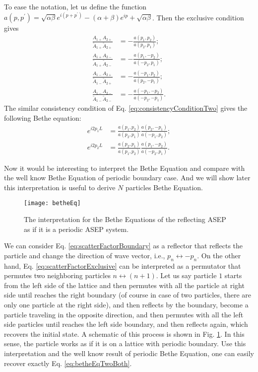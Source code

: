 To ease the notation, let us define the function $a(p, p^\prime) = \sqrt{\alpha\beta}e^{i(p+p^\prime)}-(\alpha+\beta)e^{ip}+\sqrt{\alpha\beta}$. Then the exclusive condition gives 
\begin{subequations}
    \label{eq:scatterFactorExclusive2}
    \begin{align}
        \frac{A_{1+}A_{2+}}{\tilde{A}_{1+}\tilde{A}_{2+}} & =  -\frac{a(p_1, p_2)}{a(p_2, p_1)};\\
        \frac{A_{1+}A_{2-}}{\tilde{A}_{1+}\tilde{A}_{2-}} & =  -\frac{a(p_1, -p_2)}{a(-p_2, p_1)};\\
        \frac{A_{1-}A_{2+}}{\tilde{A}_{1-}\tilde{A}_{2+}} & =  -\frac{a(-p_1, p_2)}{a(p_2, -p_1)};\\
        \frac{A_{1-}A_{2-}}{\tilde{A}_{1-}\tilde{A}_{2-}} & =  -\frac{a(-p_1, -p_2)}{a(-p_2, -p_1)}.
    \end{align}
\end{subequations}
The similar consistency condition of Eq. \eqref{eq:consistencyConditionTwo} gives the following Bethe equation:
\begin{subequations}
    \label{eq:betheEqTwoBoth}
    \begin{align}
        e^{i2p_1L} & =  \frac{a(p_1, p_2)}{a(p_2, p_1)} \frac{a(p_2, -p_1)}{a(-p_1, p_2)};\\
        e^{i2p_2L} & =  \frac{a(p_2, p_1)}{a(p_1, p_2)} \frac{a(p_1, -p_2)}{a(-p_2, p_1)}.
    \end{align}
\end{subequations}

Now it would be interesting to interpret the Bethe Equation and compare with the well know Bethe Equation of periodic boundary case. And we will show later this interpretation is useful to derive $N$ particles Bethe Equation. 
\begin{figure}[htpb]
    \centering
    \texttt{[image: betheEq]}
    \caption{The interpretation for the Bethe Equations of the reflecting ASEP as if it is a periodic ASEP system. }
    \label{fig:betheEq}
\end{figure}
We can consider Eq.  \eqref{eq:scatterFactorBoundary} as a reflector that reflects the particle and change the direction of wave vector, i.e., $p_n\leftrightarrow-p_n$.  On the other hand, Eq. \eqref{eq:scatterFactorExclusive} can be interpreted as a permutator that permutes two neighboring particles $n\leftrightarrow (n+1)$.  
Let us say particle $1$ starts from the left side of the lattice and then permutes with all the particle at right side until reaches the right boundary (of course in case of two particles, there are only one particle at the right side), and then reflects by the boundary, become a particle traveling in the opposite direction, and then permutes with all the left side particles until reaches the left side boundary, and then reflects again, which recovers the initial state. 
A schematic of this process is shown in Fig. \ref{fig:betheEq}. In this sense, the particle works as if it is on a lattice with periodic boundary. Use this interpretation and the well know result of periodic Bethe Equation, one can easily recover exactly Eq. \eqref{eq:betheEqTwoBoth}. 

